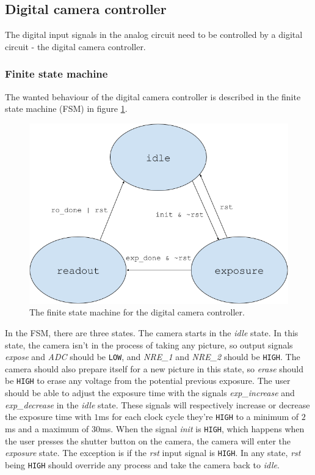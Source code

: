 \subsection{Digital camera controller}
The digital input signals in the analog circuit need to be controlled by a digital circuit - the digital camera controller.

\subsubsection{Finite state machine}
The wanted behaviour of the digital camera controller is described in the finite state machine (FSM) in figure \ref{fig:fsm}.

\begin{figure}[H]
    \centering
    \includegraphics[width=\textwidth]{graphs/fsm.png}
    \caption{The finite state machine for the digital camera controller.}
    \label{fig:fsm}
\end{figure}

In the FSM, there are three states. The camera starts in the \emph{idle} state. In this state, the camera isn't in the process of taking any picture, so output signals \emph{expose} and \emph{ADC} should be \verb|LOW|, and \emph{NRE\_1} and \emph{NRE\_2} should be \verb|HIGH|. The camera should also prepare itself for a new picture in this state, so \emph{erase} should be \verb|HIGH| to erase any voltage from the potential previous exposure. The user should be able to adjust the exposure time with the signals \emph{exp\_increase} and \emph{exp\_decrease} in the \emph{idle} state. These signals will respectively increase or decrease the exposure time with $1$ms for each clock cycle they're \verb|HIGH| to a minimum of $2$ms and a maximum of $30$ms. When the signal \emph{init} is \verb|HIGH|, which happens when the user presses the shutter button on the camera, the camera will enter the \emph{exposure} state. The exception is if the \emph{rst} input signal is \verb|HIGH|. In any state, \emph{rst} being \verb|HIGH| should override any process and take the camera back to \emph{idle}.

